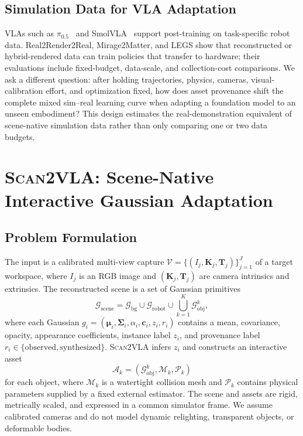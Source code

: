 \documentclass[letterpaper,10pt,conference]{ieeeconf}
\newcommand{\system}{\textsc{Scan2VLA}}
\newcommand{\piHalf}{\ensuremath{\pi_{0.5}}}
\begin{document}
\subsection{Simulation Data for VLA Adaptation}
VLAs such as \piHalf{}~\cite{black2025pi05} and
SmolVLA~\cite{shukor2025smolvla} support post-training on task-specific robot
data. Real2Render2Real, Mirage2Matter, and LEGS show that reconstructed or
hybrid-rendered data can train policies that transfer to hardware; their
evaluations include fixed-budget, data-scale, and collection-cost comparisons.
We ask a different question: after holding trajectories, physics, cameras,
visual-calibration effort, and optimization fixed, how does asset provenance
shift the complete mixed sim--real learning curve when adapting a foundation
model to an unseen embodiment? This design estimates the real-demonstration
equivalent of scene-native simulation data rather than only comparing one or two
data budgets.

\section{\system: Scene-Native Interactive Gaussian Adaptation}
\label{sec:method}

\subsection{Problem Formulation}
\label{sec:problem}

The input is a calibrated multi-view capture
$\mathcal{V}=\{(I_j,\mathbf{K}_j,\mathbf{T}_j)\}_{j=1}^{J}$ of a target
workspace, where $I_j$ is an RGB image and $(\mathbf{K}_j,\mathbf{T}_j)$ are
camera intrinsics and extrinsics. The reconstructed scene is a set of Gaussian
primitives
\begin{equation}
  \mathcal{G}_{\mathrm{scene}}
  = \mathcal{G}_{\mathrm{bg}} \cup \mathcal{G}_{\mathrm{robot}}
  \cup \bigcup_{k=1}^{K}\mathcal{G}_{\mathrm{obj}}^{k},
  \label{eq:scene-decomposition}
\end{equation}
where each Gaussian
$g_i=(\boldsymbol{\mu}_i,\boldsymbol{\Sigma}_i,\alpha_i,
\mathbf{c}_i,z_i,r_i)$ contains a mean, covariance, opacity, appearance
coefficients, instance label $z_i$, and provenance label
$r_i\in\{\mathrm{observed},\mathrm{synthesized}\}$. \system{} infers $z_i$ and
constructs an interactive asset
\begin{equation}
  \mathcal{A}_k =
  (\mathcal{G}_{\mathrm{obj}}^{k},\mathcal{M}_k,\mathcal{P}_k)
  \label{eq:asset}
\end{equation}
for each object, where $\mathcal{M}_k$ is a watertight collision mesh and
$\mathcal{P}_k$ contains physical parameters supplied by a fixed external
estimator. The scene and assets are rigid, metrically scaled, and expressed in a
common simulator frame. We assume calibrated cameras and do not model dynamic
relighting, transparent objects, or deformable bodies.
\end{document}
